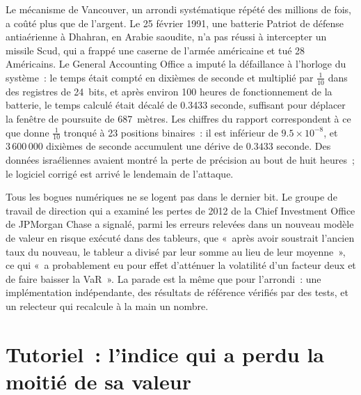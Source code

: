 Le mécanisme de Vancouver, un arrondi systématique répété des millions de fois, a coûté plus que de l'argent. Le 25 février 1991, une batterie Patriot de défense antiaérienne à Dhahran, en Arabie saoudite, n'a pas réussi à
intercepter un missile Scud, qui a frappé une caserne de l'armée américaine et tué 28 Américains. Le General Accounting Office a imputé la défaillance à l'horloge du système~: le temps était compté en dixièmes de seconde et
multiplié par $\frac1{10}$ dans des registres de 24~bits, et après environ 100 heures de fonctionnement de la batterie, le temps calculé était décalé de 0.3433 seconde, suffisant pour déplacer la fenêtre de poursuite de 687~mètres. Les
chiffres du rapport correspondent à ce que donne $\frac1{10}$ tronqué à 23 positions binaires~: il est inférieur de $9.5 \times 10^{-8}$, et $3\,600\,000$ dixièmes de seconde accumulent une dérive de $0.3433$ seconde. Des données israéliennes avaient montré
la perte de précision au bout de huit heures~; le logiciel corrigé est arrivé le lendemain de l'attaque.

Tous les bogues numériques ne se logent pas dans le dernier bit. Le groupe de travail de direction qui a examiné les pertes de 2012 de la Chief Investment Office de JPMorgan Chase a signalé, parmi les erreurs relevées dans un nouveau modèle de valeur en risque
exécuté dans des tableurs, que «~après avoir soustrait l'ancien taux du nouveau, le tableur a divisé par leur somme au lieu de leur moyenne~», ce qui «~a probablement eu pour effet
d'atténuer la volatilité d'un facteur deux et de faire baisser la VaR~». La parade est la même que pour l'arrondi~: une implémentation indépendante, des résultats de référence vérifiés par des tests, et un relecteur qui
recalcule à la main un nombre.

\section{Tutoriel~: l'indice qui a perdu la moitié de sa valeur}\label{tut:qm:floating-point-and-numerical-linear-algebra:vancouver}

